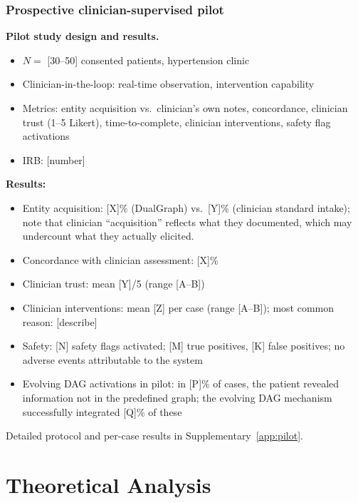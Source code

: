 \documentclass[11pt,a4paper]{article}
\newcommand{\placeholder}[1]{%
  \begin{tcolorbox}[colback=yellow!10,colframe=orange!60!black,
    fonttitle=\bfseries,title=Placeholder]
    #1
  \end{tcolorbox}%
}
\begin{document}
\subsubsection{Prospective clinician-supervised pilot}
\label{sec:pilot}

\placeholder{%
  \textbf{Pilot study design and results.}\\
  \begin{itemize}[noitemsep]
    \item $N = $ [30--50] consented patients, hypertension clinic
    \item Clinician-in-the-loop: real-time observation, intervention
          capability
    \item Metrics: entity acquisition vs.\ clinician's own notes,
          concordance, clinician trust (1--5 Likert), time-to-complete,
          clinician interventions, safety flag activations
    \item IRB: [number]
  \end{itemize}

  \textbf{Results:}
  \begin{itemize}[noitemsep]
    \item Entity acquisition: [X]\% (DualGraph) vs.\ [Y]\% (clinician
          standard intake); note that clinician ``acquisition'' reflects
          what they documented, which may undercount what they actually
          elicited.
    \item Concordance with clinician assessment: [X]\%
    \item Clinician trust: mean [Y]/5 (range [A--B])
    \item Clinician interventions: mean [Z] per case (range [A--B]);
          most common reason: [describe]
    \item Safety: [N] safety flags activated; [M] true positives,
          [K] false positives; no adverse events attributable to the system
    \item Evolving DAG activations in pilot: in [P]\% of cases, the patient
          revealed information not in the predefined graph; the evolving
          DAG mechanism successfully integrated [Q]\% of these
  \end{itemize}
  Detailed protocol and per-case results in Supplementary~\ref{app:pilot}.
}
\section{Theoretical Analysis}
\label{sec:theory}
\end{document}
